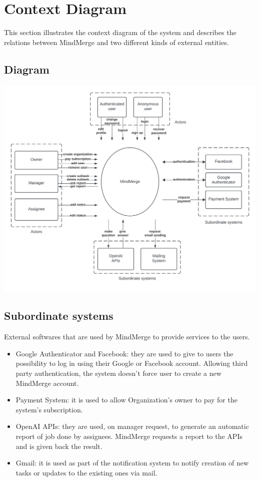\documentclass{article}
\begin{document}
\section{Context Diagram}
This section illustrates the context diagram of the system and describes the relations between MindMerge and two different kinds of external entities.

\subsection{Diagram}
\includegraphics[width=\textwidth, height=\textheight, keepaspectratio]{images/context_diagram.jpeg}

\subsection{Subordinate systems}
External softwares that are used by MindMerge to provide services to the users.
\begin{itemize}
    \item Google Authenticator and Facebook: they are used to give to users the possibility to log in using their Google or Facebook account. Allowing third party authentication, the system doesn't force user to create a new MindMerge account.
    \item Payment System: it is used to allow Organization's owner to pay for the system's subscription.
    \item OpenAI APIs: they are used, on manager request, to generate an automatic report of job done by assignees. MindMerge requests a report to the APIs and is given back the result.
    \item Gmail: it is used as part of the notification system to notify creation of new tasks or updates to the existing ones via mail.
\end{itemize}
\end{document}
